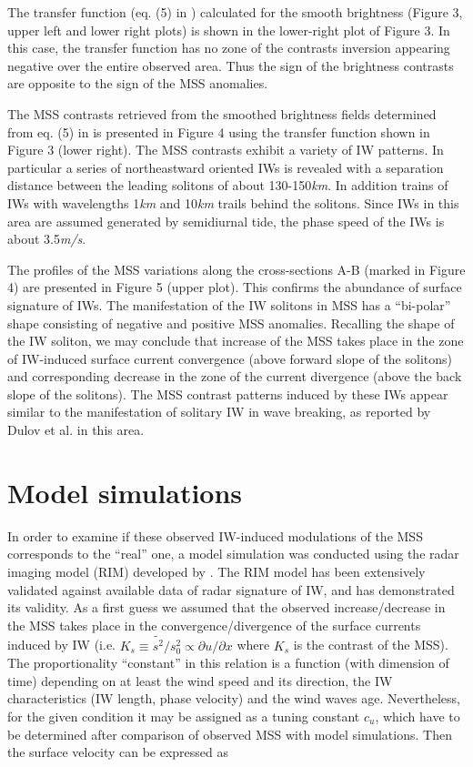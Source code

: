 \documentclass[draft,grl]{agutex}
\begin{document}
\begin{article}
The transfer function (eq. (5) in \citep{Kudryavtsev2012a}) calculated for the smooth brightness (Figure 3, upper left and lower right plots) is shown in the lower-right plot of Figure 3. In this case, the transfer function has no zone of the contrasts inversion appearing negative over the entire observed area. Thus the sign of the brightness contrasts are opposite to the sign of the MSS anomalies.

The MSS contrasts retrieved from the smoothed brightness fields determined from eq. (5) in \citep{Kudryavtsev2012a} is presented in Figure 4 using the transfer function shown in Figure 3 (lower right). The MSS contrasts exhibit a variety of IW patterns. In particular a series of northeastward oriented IWs is revealed with a separation  distance between the leading solitons of about 130-150\textit{km}. In addition trains of IWs with wavelengths 1\textit{km} and 10\textit{km} trails behind the solitons. Since IWs in this area are assumed generated by semidiurnal tide, the phase speed of the IWs is about 3.5\textit{m/s}.   

The profiles of the MSS variations along the cross-sections A-B (marked in Figure 4) are presented in Figure 5 (upper plot).  This confirms the abundance of surface signature of IWs. The manifestation of the IW solitons in MSS has a ``bi-polar'' shape consisting of negative and positive MSS anomalies. Recalling the shape of the IW soliton, we may conclude that increase of the MSS takes place in the zone of IW-induced surface current convergence (above forward slope of the solitons) and corresponding decrease in the zone of the current divergence (above the back slope of the solitons). The MSS contrast patterns induced by these IWs appear similar to the manifestation of solitary IW in wave breaking, as reported by Dulov et al. \citep{Dulov1986} in this area.


\section{Model simulations}

In order to examine if these observed IW-induced modulations of the MSS corresponds to the ``real'' one,  a model simulation was conducted using the radar imaging model (RIM) developed by \cite{Kudryavtsev2005}. The RIM model has been extensively validated against available data of radar signature of IW, and has demonstrated its validity.  As a first guess we assumed that the observed increase/decrease in the MSS takes place in the convergence/divergence of the surface currents induced by IW (i.e. $K_s \equiv \tilde{s^2} / s_0^2 \propto \partial u / \partial x$ where $K_s$ is the contrast of the MSS). The proportionality ``constant'' in this relation is a function (with dimension of time) depending on at least the wind speed and its direction, the IW characteristics (IW length, phase velocity) and the wind waves age. Nevertheless, for the given condition it may be assigned as a tuning constant $c_u$, which have to be determined after comparison of observed MSS with model simulations.  Then the surface velocity can be expressed as


\end{article}
\end{document}
